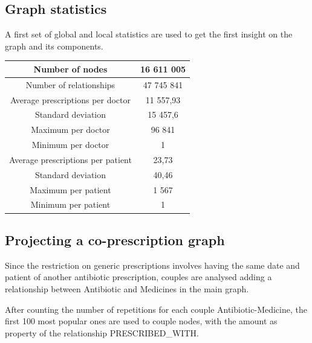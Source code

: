 \subsection{Graph statistics}
A first set of global and local statistics are used to get the first insight on the graph and its components.

\begin{center}
	\begin{tabular}{c|c}
		Number of nodes & 16 611 005 \\
		\hline
		Number of relationships & 47 745 841 \\
		\hline
		Average prescriptions per doctor & 11 557,93 \\
		\hline
		Standard deviation & 15 457,6 \\
		\hline
		Maximum per doctor & 96 841 \\
		\hline
		Minimum per doctor & 1 \\
		\hline
		Average prescriptions per patient & 23,73 \\
		\hline
		Standard deviation & 40,46 \\
		\hline
		Maximum per patient & 1 567 \\
		\hline
		Minimum per patient & 1
	\end{tabular}
\end{center}

\subsection{Projecting a co-prescription graph}
Since the restriction on generic prescriptions involves having the same date and patient of another antibiotic prescription, couples are analysed adding a relationship between Antibiotic and Medicines in the main graph.

After counting the number of repetitions for each couple Antibiotic-Medicine, the first 100 most popular ones are used to couple nodes, with the amount as property of the relationship PRESCRIBED\_WITH.

